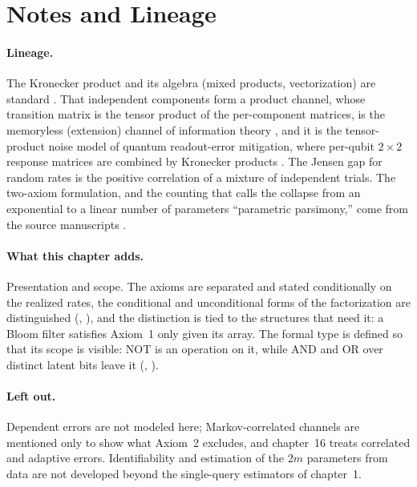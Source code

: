 %

\section{Notes and Lineage}
\label{sec:bib-notes-ch4}

\paragraph{Lineage.}
The Kronecker product and its algebra (mixed products, vectorization) are
standard \parencite[Ch.~4]{horn-johnson-matrix}. That independent components
form a product channel, whose transition matrix is the tensor product of the
per-component matrices, is the memoryless (extension) channel of information
theory \parencite[Ch.~7]{cover-thomas}, and it is the tensor-product noise model
of quantum readout-error mitigation, where per-qubit $2 \times 2$ response
matrices are combined by Kronecker products \parencite{bravyi-et-al-2021,smith-et-al-2021}.
The Jensen gap for random rates is the positive correlation of a mixture of
independent trials. The two-axiom formulation, and the counting that calls the
collapse from an exponential to a linear number of parameters ``parametric
parsimony,'' come from the source manuscripts
\parencite{towell-bernoulli-sets,towell-bernoulli-data-type}.

\paragraph{What this chapter adds.}
Presentation and scope. The axioms are separated and stated conditionally on
the realized rates, the conditional and unconditional forms of the
factorization are distinguished (,
), and the distinction is tied to the
structures that need it: a Bloom filter satisfies Axiom~1 only given its array.
The formal type is defined so that its scope is visible: NOT is an operation on
it, while AND and OR over distinct latent bits leave it
(, ).

\paragraph{Left out.}
Dependent errors are not modeled here; Markov-correlated channels are mentioned
only to show what Axiom~2 excludes, and chapter~16 treats correlated and
adaptive errors. Identifiability and estimation of the $2m$ parameters from
data are not developed beyond the single-query estimators of chapter~1.
